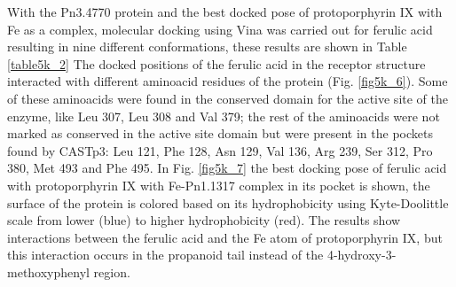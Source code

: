 \documentclass[12pt]{article}
\begin{document}
	With the Pn3.4770 protein and the best docked pose of protoporphyrin IX with Fe as a complex, molecular docking using Vina was carried out for ferulic acid resulting in nine different conformations, these results are shown in Table \ref{table5k_2} The docked positions of the ferulic acid in the receptor structure interacted with different aminoacid residues of the protein (Fig. \ref{fig5k_6}). Some of these aminoacids were found in the conserved domain for the active site of the enzyme, like Leu 307, Leu 308 and Val 379; the rest of the aminoacids were not marked as conserved in the active site domain but were present in the pockets found by CASTp3: Leu 121, Phe 128, Asn 129, Val 136, Arg 239, Ser 312, Pro 380, Met 493 and Phe 495. In Fig. \ref{fig5k_7} the best docking pose of ferulic acid with protoporphyrin IX with Fe-Pn1.1317 complex in its pocket is shown, the surface of the protein is colored based on its hydrophobicity using Kyte-Doolittle scale from lower (blue) to higher hydrophobicity (red). The results show interactions between the ferulic acid and the Fe atom of protoporphyrin IX, but this interaction occurs in the propanoid tail instead of the 4-hydroxy-3-methoxyphenyl region.
	
\end{document}
